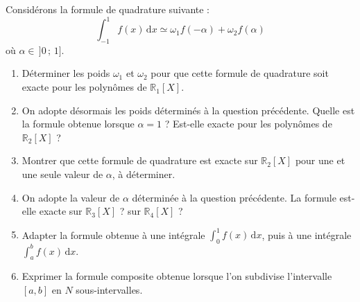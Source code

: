 Considérons la formule de quadrature suivante :
$$
\int_{-1}^1 f(x)\, \mathrm{d}x \simeq \omega_1 f(-\alpha) + \omega_2 f(\alpha)
$$
où $\alpha \in\, ]0\, ;\, 1]$.

\begin{enumerate}
    \item Déterminer les poids $\omega_1$ et $\omega_2$ pour que cette formule de quadrature soit exacte pour les polynômes de $\mathbb{R}_1[X]$.
    
    \item On adopte désormais les poids déterminés à la question précédente. Quelle est la formule obtenue lorsque $\alpha = 1$ ? Est-elle exacte pour les polynômes de $\mathbb{R}_2[X]$ ?
    
    \item Montrer que cette formule de quadrature est exacte sur $\mathbb{R}_2[X]$ pour une et une seule valeur de $\alpha$, à déterminer.
    
    \item On adopte la valeur de $\alpha$ déterminée à la question précédente. La formule est-elle exacte sur $\mathbb{R}_3[X]$ ? sur $\mathbb{R}_4[X]$ ?
    
    \item Adapter la formule obtenue à une intégrale $\int_0^1 f(x)\, \mathrm{d}x$, puis à une intégrale $\int_a^b f(x)\, \mathrm{d}x$.
    
    \item Exprimer la formule composite obtenue lorsque l'on subdivise l'intervalle $[a, b]$ en $N$ sous-intervalles.
\end{enumerate}